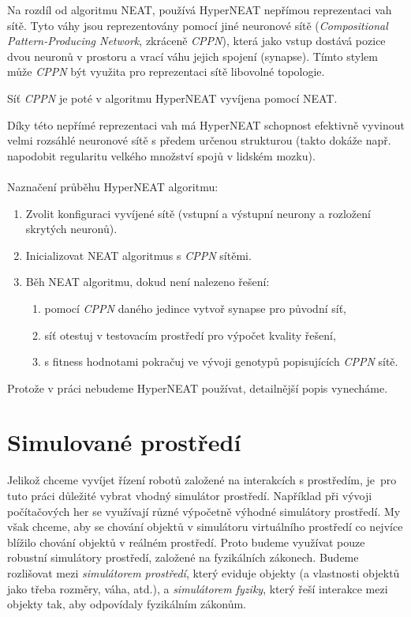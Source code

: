 Na rozdíl od algoritmu NEAT, používá HyperNEAT nepřímou
reprezentaci vah sítě. Tyto váhy jsou reprezentovány pomocí jiné neuronové
sítě (\emph{Compositional Pattern-Producing Network}, zkráceně \emph{CPPN}),
která jako vstup dostává pozice dvou neuronů v prostoru a vrací váhu jejich
spojení (synapse). Tímto stylem může \emph{CPPN} být využita pro reprezentaci
sítě libovolné topologie. 

Síť \emph{CPPN} je poté v algoritmu HyperNEAT vyvíjena pomocí NEAT.

Díky této nepřímé reprezentaci vah má HyperNEAT schopnost efektivně vyvinout
velmi rozsáhlé neuronové sítě s předem určenou strukturou (takto dokáže např.
napodobit regularitu velkého množství spojů v lidském mozku).

\paragraph{}
Naznačení průběhu HyperNEAT algoritmu:
\begin{enumerate}
    \item Zvolit konfiguraci vyvíjené sítě (vstupní a výstupní neurony a
        rozložení skrytých neuronů).
    \item Inicializovat NEAT algoritmus s \emph{CPPN} sítěmi.
    \item Běh NEAT algoritmu, dokud není nalezeno řešení:
        \begin{enumerate}
            \item pomocí \emph{CPPN} daného jedince vytvoř synapse pro původní
                síť,
            \item síť otestuj v testovacím prostředí pro výpočet kvality
                řešení,
            \item s fitness hodnotami pokračuj ve vývoji genotypů popisujících
                \emph{CPPN} sítě.
        \end{enumerate}
\end{enumerate}

Protože v práci nebudeme HyperNEAT používat, detailnější popis vynecháme.

\section{Simulované prostředí} \label{Simulované prostředí}

Jelikož chceme vyvíjet řízení robotů založené na interakcích s prostředím,
je~pro tuto práci důležité vybrat vhodný simulátor prostředí. Například při
vývoji počítačových her se využívají různé výpočetně výhodné simulátory
prostředí. My však chceme, aby se chování objektů v simulátoru virtuálního
prostředí co nejvíce blížilo chování objektů v reálném prostředí. Proto budeme
využívat pouze robustní simulátory prostředí, založené na fyzikálních zákonech.
Budeme rozlišovat mezi \emph{simulátorem prostředí}, který eviduje objekty (a
vlastnosti objektů jako třeba rozměry, váha, atd.), a \emph{simulátorem
fyziky}, který řeší interakce mezi objekty tak, aby odpovídaly fyzikálním
zákonům. 

